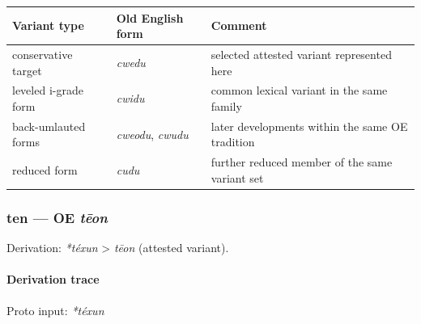 \documentclass[
  british,
  a4paper,
]{article}
\newcounter{none} %
\begin{document}
{\def\LTcaptype{none} %
\begin{longtable}[]{@{}
  >{\raggedright\arraybackslash}p{}
  >{\raggedright\arraybackslash}p{}
  >{\raggedright\arraybackslash}p{}@{}}
\toprule\noalign{}
\begin{minipage}[b]{\linewidth}\raggedright
Variant type
\end{minipage} & \begin{minipage}[b]{\linewidth}\raggedright
Old English form
\end{minipage} & \begin{minipage}[b]{\linewidth}\raggedright
Comment
\end{minipage} \\
\midrule\noalign{}
\endhead
\bottomrule\noalign{}
\endlastfoot
conservative target & {\emph{cwedu}} & selected attested variant
represented here \\
leveled i-grade form & {\emph{cwidu}} & common lexical variant in the
same family \\
back-umlauted forms & {\emph{cweodu}}, {\emph{cwudu}} & later
developments within the same OE tradition \\
reduced form & {\emph{cudu}} & further reduced member of the same
variant set \\
\end{longtable}
}

\subsubsection{\texorpdfstring{ten --- OE
\emph{tēon}}{ten --- OE tēon}}\label{ten-oe-tux113on}

Derivation: \emph{*téxun} \textgreater{} \emph{tēon} (attested variant).

\paragraph{Derivation trace}\label{derivation-trace-83}

Proto input: \emph{*téxun}

\begingroup
\setlength{\fboxsep}{6pt}
\end{document}
